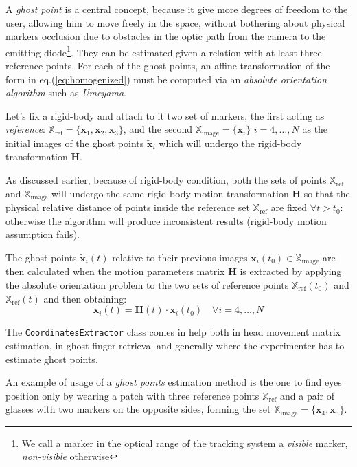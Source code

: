 \documentclass[acmtocl,acmnow]{acmtrans2m}
\begin{document}
A \emph{ghost point} is a central concept, because it give more degrees of
freedom to the user, allowing him to move freely in the space, without bothering
about physical markers occlusion due to obstacles in the optic path from the
camera to the emitting diode\footnote{We call a marker in the optical range of the tracking system a \emph{visible} marker, \emph{non-visible} otherwise}.
They can be estimated given a relation with at
least three reference points. For each of the ghost points, an affine
transformation of the form in eq.(\ref{eq:homogenized}) must be computed via an
\emph{absolute orientation algorithm} such as \emph{Umeyama}.

Let's fix a rigid-body and attach to it two set of markers, the first acting as
\emph{reference}: $\mathbb{X}_{\textrm{ref}} = \{
\mathbf{x}_1,\mathbf{x}_2,\mathbf{x}_3 \}$,
and the second $\mathbb{X}_{\textrm{image}} =\{ \mathbf{x}_i \}$  $i=4,\ldots,N$
as the initial images of the ghost points $\mathbf{\tilde{x}}_{i}$  which will
undergo the rigid-body transformation $\mathbf{H}$.

As discussed earlier, because of rigid-body condition, both the sets of points $\mathbb{X}_{\textrm{ref}}$ and $\mathbb{X}_{\textrm{image}}$ will undergo the same rigid-body motion 
transformation $\mathbf{H}$ so 
that the physical relative distance of points inside the reference set
$\mathbb{X}_{\textrm{ref}}$ are fixed $\forall t>t_0$: otherwise the
algorithm will produce inconsistent results (rigid-body motion assumption fails).

The ghost points  $\tilde{\mathbf{x}}_i(t)$ relative to their previous images
$\mathbf{x}_i(t_0) \in \mathbb{X}_{\textrm{image}}$ are then calculated when the motion parameters matrix
$\mathbf{H}$ is extracted by applying the absolute orientation problem to the
two sets of reference points $\mathbb{X}_{\textrm{ref}}(t_0)$ and $\mathbb{X}_{\textrm{ref}}(t)$ and then obtaining:
\begin{equation}
	\tilde{\mathbf{x}}_i(t) = \mathbf{H}(t)\cdot \mathbf{x}_i(t_0) \quad
\forall i=4,\ldots,N
\end{equation}

The \verb=CoordinatesExtractor= class comes in help both in head movement matrix
estimation, in ghost finger retrieval and generally where the experimenter has
to estimate ghost points.

An example of usage of a \emph{ghost points} estimation method is the one to
find eyes position only by wearing a patch with three reference points
$\mathbb{X}_{\textrm{ref}}$ and a
pair of glasses with two markers on the opposite sides, forming the set
$\mathbb{X}_{\textrm{image}}= \{ \mathbf{x}_4, \mathbf{x}_5 \}$.
 
\end{document}
